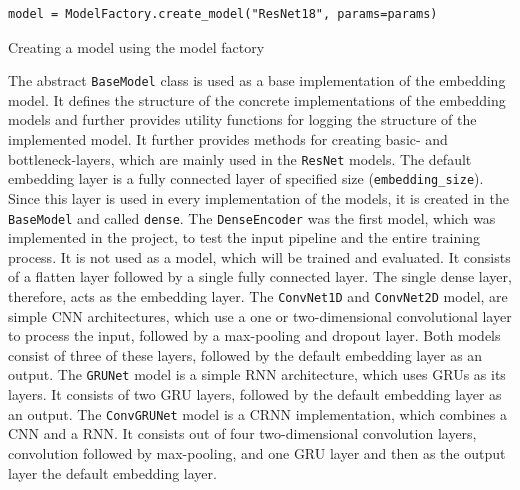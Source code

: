 \begin{code}[htbp]
\begin{verbatim}
model = ModelFactory.create_model("ResNet18", params=params)
\end{verbatim}
\caption{Creating a model using the model factory}
\label{code:Model-Factory-Creating}
\end{code}
\noindent
The abstract \texttt{BaseModel} class is used as a base implementation of the embedding model. It defines the structure of the concrete implementations of the embedding models and further provides utility functions for logging the structure of the implemented model. It further provides methods for creating basic- and bottleneck-layers, which are mainly used in the \texttt{ResNet} models. The default embedding layer is a fully connected layer of specified size (\texttt{embedding\_size}). Since this layer is used in every implementation of the models, it is created in the \texttt{BaseModel} and called \texttt{dense}.
\newline
\newline
The \texttt{DenseEncoder} was the first model, which was implemented in the project, to test the input pipeline and the entire training process. It is not used as a model, which will be trained and evaluated. It consists of a flatten layer followed by a single fully connected layer. The single dense layer, therefore, acts as the embedding layer.
\newline
\newline
The \texttt{ConvNet1D} and \texttt{ConvNet2D} model, are simple \gls{CNN} architectures, which use a one or two-dimensional convolutional layer to process the input, followed by a max-pooling and dropout layer. Both models consist of three of these layers, followed by the default embedding layer as an output.
\newline
\newline
The \texttt{GRUNet} model is a simple \gls{RNN} architecture, which uses \glspl{GRU} as its layers. It consists of two \gls{GRU} layers, followed by the default embedding layer as an output.
\newline
\newline
The \texttt{ConvGRUNet} model is a \gls{CRNN} implementation, which combines a \gls{CNN} and a \gls{RNN}. It consists out of four two-dimensional convolution layers, convolution followed by max-pooling, and one \gls{GRU} layer and then as the output layer the default embedding layer.
\newline
\newline
